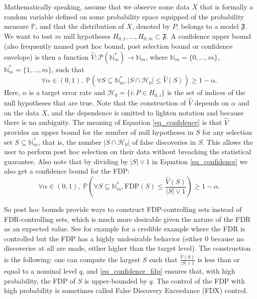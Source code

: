 \documentclass[
  11pt,
  a4paper,
]{article}
\theoremstyle{plain}
\theoremstyle{plain}
\theoremstyle{definition}
\theoremstyle{plain}
\theoremstyle{definition}
\theoremstyle{remark}
\begin{document}
Mathematically speaking, assume that we observe some data \(X\) that is
formally a random variable defined on some probability space equipped of
the probability measure \(\mathbb P\), and that the distribution of
\(X\), denoted by \(P\), belongs to a model \(\mathfrak{F}\). We want to
test \(m\) null hypotheses
\(H_{0,1},\dotsc,H_{0,m} \subset \mathfrak{F}\). A confidence upper
bound (also frequently named post hoc bound, post selection bound or
confidence envelope) is then a function
\(\widehat V: \mathcal{P}(\mathbb{N}_m^*) \to \mathbb{N}_m\), where
\(\mathbb{N}_m=\{0,\dotsc,m\}\), \(\mathbb{N}_m^*=\{1,\dotsc,m\}\), such
that \begin{equation}
\forall \alpha \in (0,1),\; \mathbb{P}\left(\forall S \subseteq \mathbb{N}_m^*, |S\cap \mathcal{H}_0|\leq \widehat V(S)\right)\geq 1-\alpha.
\label{eq_confidence}
\end{equation} Here, \(\alpha\) is a target error rate and
\(\mathcal{H}_0=\{i: P\in H_{0,i}\}\) is the set of indices of the null
hypotheses that are true. Note that the construction of \(\widehat V\)
depends on \(\alpha\) and on the data \(X\), and the dependence is
omitted to lighten notation and because there is no ambiguity. The
meaning of Equation \eqref{eq_confidence} is that \(\widehat V\)
provides an upper bound for the number of null hypotheses in \(S\) for
any selection set \(S\subseteq \mathbb{N}_m^*\), that is, the number
\(|S\cap \mathcal{H}_0|\) of false discoveries in \(S\). This allows the
user to perform post hoc selection on their data without breaching the
statistical guarantee. Also note that by dividing by \(|S|\vee 1\) in
Equation \eqref{eq_confidence} we also get a confidence bound for the
FDP: \begin{equation}
\forall \alpha \in (0,1),\; \mathbb{P}\left(\forall S \subseteq \mathbb{N}_m^*, \mathrm{FDP}(S)\leq \frac{\widehat V(S)}{|S|\vee 1}\right)\geq 1-\alpha.
\label{eq_confidence_fdp}
\end{equation}

So post hoc bounds provide ways to construct FDP-controlling sets
instead of FDR-controlling sets, which is much more desirable given the
nature of the FDR as an expected value. See for example \citep[Figure
4]{MR3418717} for a credible example where the FDR is controlled but the
FDP has a highly undesirable behavior (either 0 because no discoveries
at all are made, either higher than the target level). The construction
is the following: one can compute the largest \(S\) such that
\(\frac{\widehat V(S)}{|S|\vee 1}\) is less than or equal to a nominal
level \(q\), and \eqref{eq_confidence_fdp} ensures that, with high
probability, the FDP of \(S\) is upper-bounded by \(q\). The control of
the FDP with high probability is sometimes called False Discovery
Exceedance (FDX) control.
\end{document}
